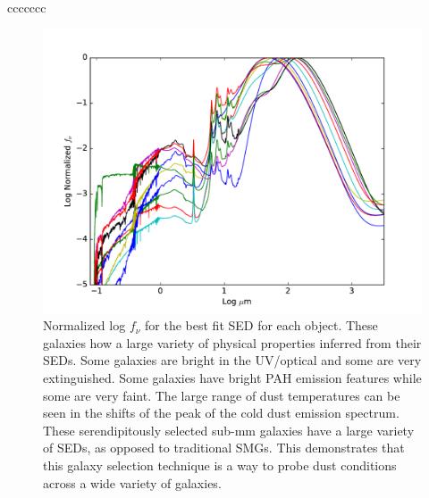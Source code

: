 \documentclass[preprint,natbib209]{aastex}
\begin{document}
\begin{deluxetable}{ccccccc}
\enddata
{}
\end{deluxetable}


\begin{figure}[t]
\centering
\includegraphics[scale=0.8]{all_sed.pdf}
\caption{Normalized log $f_\nu$ for the best fit SED for each object. These galaxies how a large variety of physical properties inferred from their SEDs. Some galaxies are bright in the UV/optical and some are very extinguished. Some galaxies have bright PAH emission features while some are very faint. The large range of dust temperatures can be seen in the shifts of the peak of the cold dust emission spectrum. These serendipitously selected sub-mm galaxies have a large variety of SEDs, as opposed to traditional SMGs. This demonstrates that this galaxy selection technique is a way to probe dust conditions across a wide variety of galaxies.}
\label{fig:allsed}
\end{figure}
\end{document}
